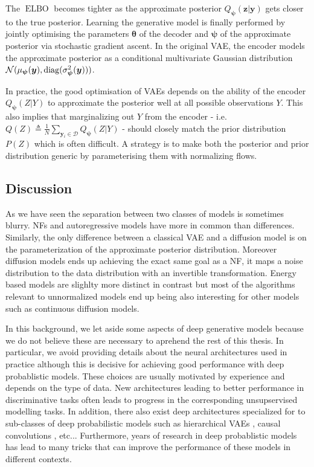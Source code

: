 The $\operatorname{ELBO}$ becomes tighter as the approximate posterior $Q_{\bm \psi}(\mathbf{z}|\mathbf{y})$ gets closer to the true posterior.
Learning the generative model is finally performed by jointly optimising the parameters $\mathbf{\theta}$ of the decoder and ${\bm \psi}$ of the approximate posterior via stochastic gradient ascent.
In the original VAE, the encoder models the approximate posterior as a conditional multivariate Gaussian distribution $\mathcal{N}(\mu_{\bm \psi}(\mathbf{y}), \diag(\sigma_{\bm\psi}^2(\mathbf{y})))$.

In practice, the good optimisation of VAEs depends on the ability of the encoder $Q_{\bm \psi}(Z|Y)$ to approximate the posterior well at all possible observations $Y$. This also implies that marginalizing out $Y$ from the encoder - i.e. $Q(Z) \triangleq \frac{1}{N}\sum_{\bm{y}_i \in \mathcal{D}} Q_{\bm \psi}(Z|Y)$ - should closely match the prior distribution $P(Z)$ which is often difficult. A strategy is to make both the posterior and prior distribution generic by parameterising them with normalizing flows.
\subsection{Discussion}
As we have seen the separation between two classes of models is sometimes blurry. NFs and autoregressive models have more in common than differences. Similarly, the only difference between a classical VAE and a diffusion model is on the parameterization of the approximate posterior distribution. Moreover diffusion models ends up achieving the exact same goal as a NF, it maps a noise distribution to the data distribution with an invertible transformation. Energy based models are slighlty more distinct in contrast but most of the algorithms relevant to unnormalized models end up being also interesting for other models such as continuous diffusion models.

In this background, we let aside some aspects of deep generative models because we do not believe these are necessary to aprehend the rest of this thesis. In particular, we avoid providing details about the neural architectures used in practice although this is decisive for achieving good performance with deep probablistic models. These choices are usually motivated by experience and depends on the type of data. New architectures leading to better performance in discriminative tasks often leads to progress in the corresponding unsupservised modelling tasks. In addition, there also exist deep architectures specialized for to sub-classes of deep probabilistic models such as hierarchical VAEs \citep{vahdat_nvae_2020}, causal convolutions \citep{van_den_oord_wavenet_2016}, etc... Furthermore, years of research in deep probablistic models has lead to many tricks that can improve the performance of these models in different contexts.

